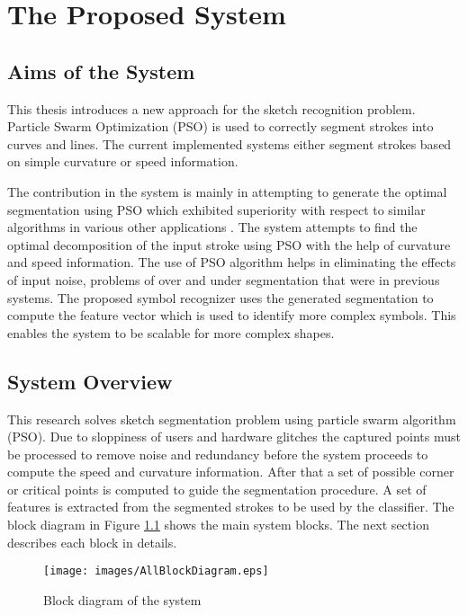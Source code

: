 \chapter{The Proposed System}
\label{sec:proposedSystem}
\section{Aims of the System}
\label{sec:AimsOfTheSystem}
This thesis introduces a new approach for the sketch recognition problem. Particle Swarm Optimization (PSO) is used to correctly segment strokes into curves and lines. The current implemented systems either segment strokes based on simple curvature\cite{meanshift10,earlySketchbased4} or speed information\cite{earlySketchbased4}.


The contribution in the system is mainly in attempting to generate the optimal segmentation using PSO which exhibited superiority with respect to similar algorithms in various other applications \cite{PolygonApproximationPSO}. The system attempts to find the optimal decomposition of the input stroke using PSO with the help of curvature and speed information. The use of PSO algorithm helps in eliminating the effects of input noise, problems of over and under segmentation that were in previous systems. The proposed symbol recognizer uses the generated segmentation to compute the feature vector which is used to identify more complex symbols. This enables the system to be scalable for more complex shapes.


\section{System Overview}
\label{sec:AnOverviewOfTheSystem}
   This research solves sketch segmentation problem using particle swarm algorithm (PSO).  Due to sloppiness of users and hardware glitches the captured points must be processed to remove noise and redundancy before the system proceeds to compute the speed and curvature information. After that a set of possible corner or critical points is computed to guide the segmentation procedure.  A set of features is extracted from the segmented strokes to be used by the classifier.  %
The block diagram in Figure \ref{fig:Blockdiagram} shows the main system blocks. The next section describes each block in details.
\begin{figure}[]
	\centering
	
\begin{center}
	\texttt{[image: images/AllBlockDiagram.eps]}
	\caption[The System Block Diagram]{Block diagram of the system}
	\label{fig:Blockdiagram}
\end{center}
\end{figure}
 

